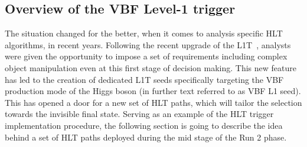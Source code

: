 \subsection{Overview of the VBF Level-1 trigger}
\label{l1:vbf}
\hspace{10pt} The situation changed for the better, when it comes to analysis specific HLT algorithms, in recent years. Following the recent upgrade of the L1T~\cite{cms:l1_paper}, analysts were given the opportunity to impose a set of requirements including complex object manipulation even at this first stage of decision making. This new feature has led to the creation of dedicated L1T seeds specifically targeting the VBF production mode of the Higgs boson (in further text referred to as VBF L1 seed). This has opened a door for a new set of HLT paths, which will tailor the selection towards the invisible final state. Serving as an example of the HLT trigger implementation procedure, the following section is going to describe the idea behind a set of HLT paths deployed during the mid stage of the Run 2 phase.

